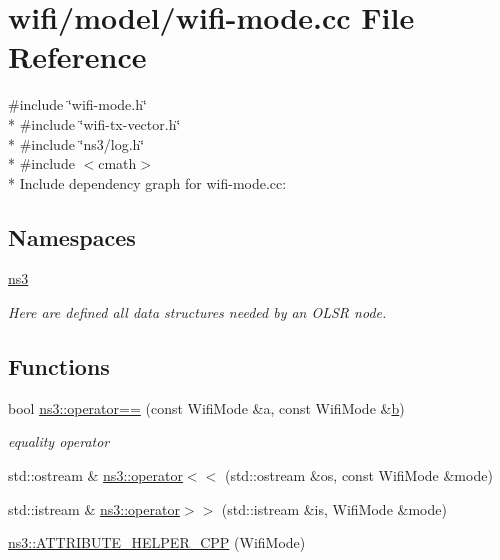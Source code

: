 \hypertarget{wifi-mode_8cc}{}\section{wifi/model/wifi-\/mode.cc File Reference}
\label{wifi-mode_8cc}
{\ttfamily \#include \char`\"{}wifi-\/mode.\+h\char`\"{}}\\*
{\ttfamily \#include \char`\"{}wifi-\/tx-\/vector.\+h\char`\"{}}\\*
{\ttfamily \#include \char`\"{}ns3/log.\+h\char`\"{}}\\*
{\ttfamily \#include $<$cmath$>$}\\*
Include dependency graph for wifi-\/mode.cc\+:
\subsection*{Namespaces}
\begin{DoxyCompactItemize}
\item 
 \hyperlink{namespacens3}{ns3}
\begin{DoxyCompactList}\small\item\em Here are defined all data structures needed by an O\+L\+SR node. \end{DoxyCompactList}\end{DoxyCompactItemize}
\subsection*{Functions}
\begin{DoxyCompactItemize}
\item 
bool \hyperlink{namespacens3_aae78c1f33c9ff6b5b15dfb2551eaf6a0}{ns3\+::operator==} (const Wifi\+Mode \&a, const Wifi\+Mode \&\hyperlink{lte__pathloss_8m_a21ad0bd836b90d08f4cf640b4c298e7c}{b})
\begin{DoxyCompactList}\small\item\em equality operator \end{DoxyCompactList}\item 
std\+::ostream \& \hyperlink{namespacens3_a57863964b1cdf873dff3b24df1f0c04b}{ns3\+::operator$<$$<$} (std\+::ostream \&os, const Wifi\+Mode \&mode)
\item 
std\+::istream \& \hyperlink{namespacens3_ad5530945ff978ccc2497d99cd67e0588}{ns3\+::operator$>$$>$} (std\+::istream \&is, Wifi\+Mode \&mode)
\item 
\hyperlink{namespacens3_a2e113dc85f4ed699028e0d75b438af99}{ns3\+::\+A\+T\+T\+R\+I\+B\+U\+T\+E\+\_\+\+H\+E\+L\+P\+E\+R\+\_\+\+C\+PP} (Wifi\+Mode)
\end{DoxyCompactItemize}
